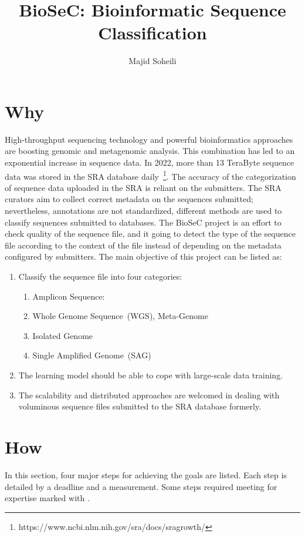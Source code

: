 \documentclass[a4paper]{article}
\newcommand{\remeet}{{\color{red} \dag}}
\begin{document}
    \title{BioSeC: Bioinformatic Sequence Classification}
    \author{Majid Soheili}
    \maketitle

    \section{Why}\label{sec:why}
    High-throughput sequencing technology and powerful bioinformatics approaches are boosting genomic and metagenomic analysis.
    This combination has led to an exponential increase in sequence data.
    In 2022, more than 13 TeraByte sequence data was stored in the SRA database daily~\footnote{https://www.ncbi.nlm.nih.gov/sra/docs/sragrowth/}.
    The accuracy of the categorization of sequence data uploaded in the SRA is reliant on the submitters.
    The SRA curators aim to collect correct metadata on the sequences submitted;
    nevertheless, annotations are not standardized, different methods are used to classify sequences submitted to databases.
    The BioSeC project is an effort to check quality of the sequence file, and it going to detect the type of the sequence file according to the context of the file instead of depending on the metadata configured by submitters.
    The main objective of this project can be listed as:
    \begin{enumerate}
        \item Classify the sequence file into four categories:
        \begin{enumerate}
          \item Amplicon Sequence:
          \item Whole Genome Sequence~(WGS), Meta-Genome
          \item Isolated Genome
          \item Single Amplified Genome~(SAG)
        \end{enumerate}
        \item The learning model should be able to cope with large-scale data training.
        \item The scalability and distributed approaches are welcomed in dealing with voluminous sequence files submitted to the SRA database formerly.
    \end{enumerate}

    \section{How}\label{sec:how}
    In this section, four major steps for achieving the goals are listed.
    Each step is detailed by a deadline and a measurement.
    Some steps required meeting for expertise marked with \remeet.
\end{document}
